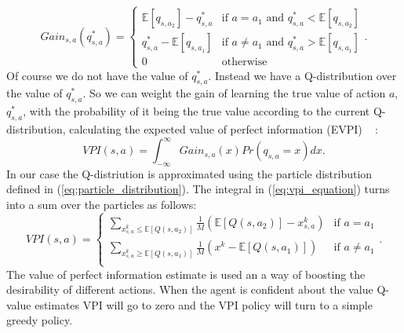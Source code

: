 \begin{equation}
	Gain_{s,a}(q^*_{s,a}) = \begin{cases}
    			\mathbb{E}[q_{s,a_2}]- q^*_{s,a}  & \text{if } a=a_1 \text{ and } q^*_{s,a}< \mathbb{E}[q_{s,a_2}] \\
                q^*_{s,a} - \mathbb{E}[q_{s,a_1}]  & \text{if } a \neq a_1 \text{ and  }q^*_{s,a}> \mathbb{E} [q_{s,a_1}] \\
                0 & \text{otherwise}
    		\end{cases}.
\end{equation}
Of course we do not have the value of $q^*_{s,a}$. Instead we have a Q-distribution over the value of $q^*_{s,a}$. So we can weight the gain of learning the true value of action $a$, $q^*_{s,a}$, with the probability of it being the true value according to the current Q-distribution, calculating the expected value of perfect information (EVPI) ~\cite{Dearden98bayesianq-learning} :
\begin{equation}
VPI(s,a)=\int_{-\infty}^{\infty} Gain_{s,a}(x) Pr(q_{s,a}=x) dx.
\label{eq:vpi_equation}
\end{equation}
In our case the Q-distriution is approximated using the particle distribution defined in (\ref{eq:particle_distribution}). The integral in (\ref{eq:vpi_equation}) turns into a sum over the particles as follows:
\begin{equation}
	VPI(s,a) = \begin{cases}
    			\sum_{x^k_{s,a} \leq \mathbb{E}[Q(s,a_2)]} \frac{1}{M}\left(\mathbb{E}[Q(s,a_2)]- x^k_{s,a}\right)  & \text{if } a=a_1 \\
                \sum_{x^k_{s,a} \geq \mathbb{E}[Q(s,a_1)]} \frac{1}{M}\left(x^k -\mathbb{E}[Q(s,a_1)]\right)  & \text{if } a \neq a_1 \\
    		\end{cases}.
\end{equation}
The value of perfect information estimate is used an a way of boosting the desirability of different actions. When the agent is confident about the value Q-value estimates VPI will go to zero and the VPI policy will turn to a simple greedy policy.

